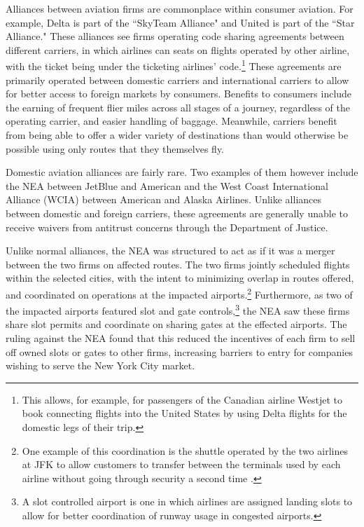 \documentclass{article}
\begin{document}
	Alliances between aviation firms are commonplace within consumer aviation. For example, Delta is part of the ``SkyTeam Alliance" and United is part of the ``Star Alliance." These alliances see firms operating code sharing agreements between different carriers, in which airlines can seats on flights operated by other airline, with the ticket being under the ticketing airlines' code.\footnote{This allows, for example, for passengers of the Canadian airline Westjet to book connecting flights into the United States by using Delta flights for the domestic legs of their trip.}  These agreements are primarily operated between domestic carriers and international carriers to allow for better access to foreign markets by consumers. Benefits to consumers include the earning of frequent flier miles across all stages of a journey, regardless of the operating carrier, and easier handling of baggage. Meanwhile, carriers benefit from being able to offer a wider variety of destinations than would otherwise be possible using only routes that they themselves fly.
	
	Domestic aviation alliances are fairly rare. Two examples of them however include the NEA between JetBlue and American and the West Coast International Alliance (WCIA) between American and Alaska Airlines. Unlike alliances between domestic and foreign carriers, these agreements are generally unable to receive waivers from antitrust concerns through the Department of Justice. 
	
	Unlike normal alliances, the NEA was structured to act as if it was a merger between the two firms on affected routes. The two firms jointly scheduled flights within the selected cities, with the intent to minimizing overlap in routes offered, and coordinated on operations at the impacted airports.\footnote{One example of this coordination is the shuttle operated by the two airlines at JFK to allow customers to transfer between the terminals used by each airline without going through security a second time \citep{griff_riding_2021}.} Furthermore, as two of the impacted airports featured slot and gate controls,\footnote{A slot controlled airport is one in which airlines are assigned landing slots to allow for better coordination of runway usage in congested airports.} the NEA saw these firms share slot permits and coordinate on sharing gates at the effected airports. The ruling against the NEA found that this reduced the incentives of each firm to sell off owned slots or gates to other firms, increasing barriers to entry for companies wishing to serve the New York City market.
	
\end{document}
